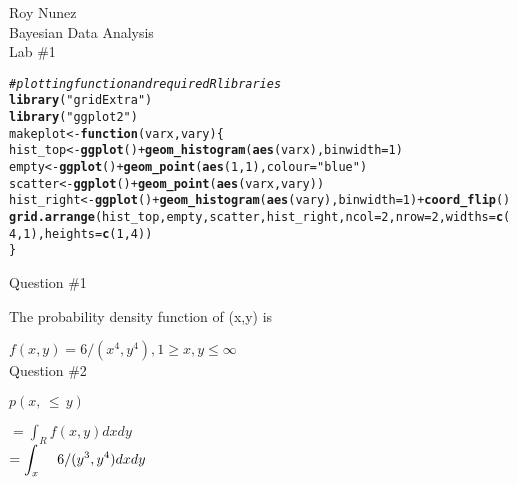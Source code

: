 \documentclass[11]{article}\usepackage[]{graphicx}\usepackage[]{color}
\makeatletter
\newcommand{\hlnum}[1]{\textcolor[rgb]{0.686,0.059,0.569}{#1}}%
\newcommand{\hlstr}[1]{\textcolor[rgb]{0.192,0.494,0.8}{#1}}%
\newcommand{\hlcom}[1]{\textcolor[rgb]{0.678,0.584,0.686}{\textit{#1}}}%
\newcommand{\hlopt}[1]{\textcolor[rgb]{0,0,0}{#1}}%
\newcommand{\hlstd}[1]{\textcolor[rgb]{0.345,0.345,0.345}{#1}}%
\newcommand{\hlkwa}[1]{\textcolor[rgb]{0.161,0.373,0.58}{\textbf{#1}}}%
\newcommand{\hlkwb}[1]{\textcolor[rgb]{0.69,0.353,0.396}{#1}}%
\newcommand{\hlkwc}[1]{\textcolor[rgb]{0.333,0.667,0.333}{#1}}%
\newcommand{\hlkwd}[1]{\textcolor[rgb]{0.737,0.353,0.396}{\textbf{#1}}}%
\newenvironment{kframe}{%
 \def\at@end@of@kframe{}%
 \ifinner\ifhmode%
  \def\at@end@of@kframe{\end{minipage}}%
  \begin{minipage}{\columnwidth}%
 \fi\fi%
 \def\FrameCommand##1{\hskip\@totalleftmargin \hskip-\fboxsep
 \colorbox{shadecolor}{##1}\hskip-\fboxsep
     \hskip-\linewidth \hskip-\@totalleftmargin \hskip\columnwidth}%
 \MakeFramed {\advance\hsize-\width
   \@totalleftmargin\z@ \linewidth\hsize
   \@setminipage}}%
 {\par\unskip\endMakeFramed%
 \at@end@of@kframe}
\newenvironment{knitrout}{}{} %
\makeatother
\begin{document}
\begin{flushleft}

Roy Nunez\\
Bayesian Data Analysis\\
Lab \#1\\
\begin{knitrout}
\color{fgcolor}\begin{kframe}
\begin{alltt}
\hlcom{#plotting function and required R libraries}
\hlkwd{library}\hlstd{(}\hlstr{"gridExtra"}\hlstd{)}
\hlkwd{library}\hlstd{(}\hlstr{"ggplot2"}\hlstd{)}
\hlstd{makeplot}\hlkwb{<-}\hlkwa{function}\hlstd{(}\hlkwc{varx}\hlstd{,}\hlkwc{vary}\hlstd{)\{}
  \hlstd{hist_top} \hlkwb{<-} \hlkwd{ggplot}\hlstd{()}\hlopt{+}\hlkwd{geom_histogram}\hlstd{(}\hlkwd{aes}\hlstd{(varx),}\hlkwc{binwidth} \hlstd{=} \hlnum{1}\hlstd{)}
  \hlstd{empty}\hlkwb{<-}\hlkwd{ggplot}\hlstd{()}\hlopt{+}\hlkwd{geom_point}\hlstd{(}\hlkwd{aes}\hlstd{(}\hlnum{1}\hlstd{,}\hlnum{1}\hlstd{),} \hlkwc{colour}\hlstd{=}\hlstr{"blue"}\hlstd{)}
  \hlstd{scatter} \hlkwb{<-} \hlkwd{ggplot}\hlstd{()}\hlopt{+}\hlkwd{geom_point}\hlstd{(}\hlkwd{aes}\hlstd{(varx, vary))}
  \hlstd{hist_right} \hlkwb{<-} \hlkwd{ggplot}\hlstd{()}\hlopt{+}\hlkwd{geom_histogram}\hlstd{(}\hlkwd{aes}\hlstd{(vary),}\hlkwc{binwidth} \hlstd{=} \hlnum{1}\hlstd{)}\hlopt{+}\hlkwd{coord_flip}\hlstd{()}
  \hlkwd{grid.arrange}\hlstd{(hist_top, empty, scatter, hist_right,} \hlkwc{ncol}\hlstd{=}\hlnum{2}\hlstd{,} \hlkwc{nrow}\hlstd{=}\hlnum{2}\hlstd{,} \hlkwc{widths}\hlstd{=}\hlkwd{c}\hlstd{(}\hlnum{4}\hlstd{,} \hlnum{1}\hlstd{),} \hlkwc{heights}\hlstd{=}\hlkwd{c}\hlstd{(}\hlnum{1}\hlstd{,} \hlnum{4}\hlstd{))}
\hlstd{\}}
\end{alltt}
\end{kframe}
\end{knitrout}


\vspace{ 6  mm} 
Question \#1

The probability density function of (x,y) is 

$f(x,y) =6/(x^4,y^4), 1 \geq x, y \leq \infty$\\




Question \#2


$p(x,\,\leq\,y)$

$\displaystyle{=\int_R f(x,y) dxdy}$\\
$\displaystyle{=\int_x   \hspace{4 mm}  6/(y^3,y^4)dxdy}$\\


\end{flushleft}
\end{document}
